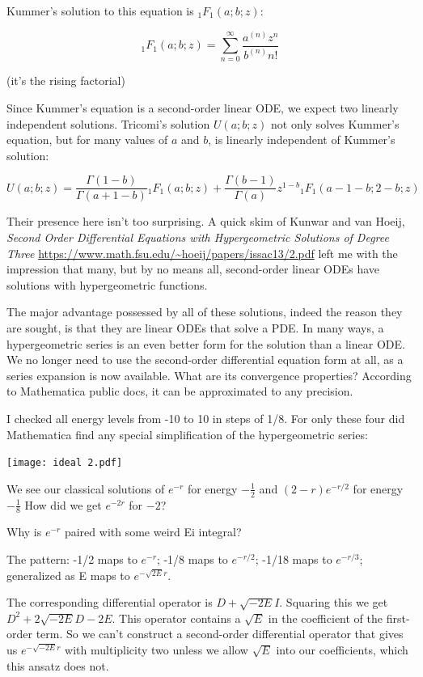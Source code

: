 \documentclass{article}
\begin{document}
Kummer's solution to this equation is ${}_1F_1(a;b;z)$:

\begin{equation}
{}_1F_1(a;b;z) = \sum_{n=0}^\infty \frac{a^{(n)}z^n}{b^{(n)}n!}
\end{equation}

(it's the rising factorial)

Since Kummer's equation is a second-order linear ODE, we expect two linearly independent
solutions.  Tricomi's solution $U(a;b;z)$ not only solves Kummer's equation, but
for many values of $a$ and $b$, is linearly independent of Kummer's solution:

\begin{equation}
U(a;b;z) = \frac{\Gamma(1-b)}{\Gamma(a+1-b)} {}_1F_1(a;b;z) + \frac{\Gamma(b-1)}{\Gamma(a)} z^{1-b} {}_1F_1(a-1-b;2-b;z)
\end{equation}

Their presence here isn't too surprising.  A quick skim of Kunwar and van Hoeij,
{\it Second Order Differential Equations with Hypergeometric Solutions of Degree Three}
\url{https://www.math.fsu.edu/~hoeij/papers/issac13/2.pdf}
left me with the impression that many, but by no means all, second-order linear ODEs have
solutions with hypergeometric functions.

The major advantage possessed by all of these solutions, indeed the reason they are sought,
is that they are linear ODEs that solve a PDE.  In many ways, a hypergeometric series
is an even better form for the solution than a linear ODE.
We no longer need to use the second-order differential equation
form at all, as a series expansion is now available.  What are its convergence properties?
According to Mathematica public docs, it can be approximated to any precision.

I checked all energy levels from -10 to 10 in steps of 1/8.  For only these four did
Mathematica find any special simplification of the hypergeometric series:

\texttt{[image: ideal 2.pdf]}

We see our classical solutions of $e^{-r}$ for energy $-\frac{1}{2}$ and $(2-r)e^{-r/2}$
for energy $-\frac{1}{8}$  How did we get $e^{-2r}$ for $-2$?

Why is $e^{-r}$ paired with some weird Ei integral?

The pattern: -1/2 maps to $e^{-r}$; -1/8 maps to $e^{-r/2}$; -1/18 maps to $e^{-r/3}$;
generalized as E maps to $e^{-\sqrt{2E}r}$.

The corresponding differential operator is $D+\sqrt{-2E}I$.  Squaring this we get $D^2 + 2\sqrt{-2E}D - 2E$.
This operator contains a $\sqrt{E}$ in the coefficient of the first-order term.  So we can't construct
a second-order differential operator that gives us $e^{-\sqrt{-2E}r}$ with multiplicity two unless we
allow $\sqrt{E}$ into our coefficients, which this ansatz does not.
\end{document}
